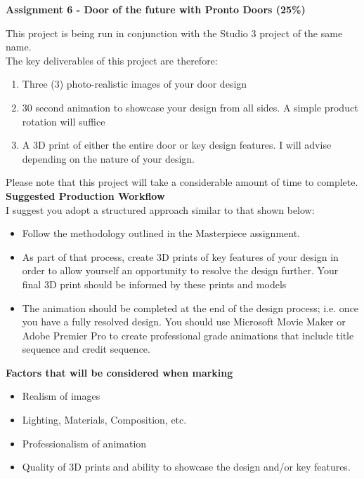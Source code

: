 
	
\begin{flushleft}
\Large\textbf{Assignment 6 - Door of the future with Pronto Doors (25\%)}\\
\end{flushleft}

This project is being run in conjunction with the Studio 3 project of the same name.\\

The key deliverables of this project are therefore:

\begin{enumerate}
	\item Three (3) photo-realistic images of your door design 
	\item 30 second animation to showcase your design from all sides. A simple product rotation will suffice
	\item A 3D print of either the entire door or key design features.  I will advise depending on the nature of your design.
\end{enumerate}

Please note that this project will take a considerable amount of time to complete.\\

\textbf{Suggested Production Workflow}\\
I suggest you adopt a structured approach similar to that shown below:

\begin{itemize}
	\item Follow the methodology outlined in the Masterpiece assignment.
	\item As part of that process, create 3D prints of key features of your design in order to allow yourself an opportunity to resolve the design further.  Your final 3D print should be informed by these prints and models
	\item The animation should be completed at the end of the design process; i.e. once you have a fully resolved design.  You should use Microsoft Movie Maker or Adobe Premier Pro to create professional grade animations that include title sequence and credit sequence.
\end{itemize}





\textbf{Factors that will be considered when marking}\\
\begin{itemize}
	\item Realism of images
	\item Lighting, Materials, Composition, etc.
	\item Professionalism of animation
	\item Quality of 3D prints and ability to showcase the design and/or key features.
\end{itemize}


